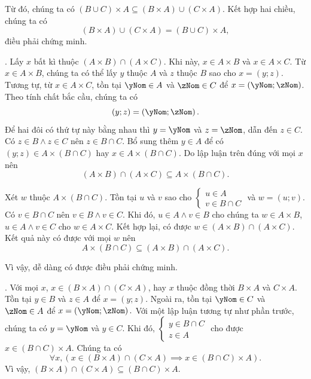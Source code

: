 Từ đó, chúng ta có $(B \cup C) \times A \subseteq (B \times A) \cup (C \times A)$. Kết hợp hai chiều, chúng ta có $$(B \times A) \cup (C \times A) = (B \cup C) \times A,$$
điều phải chứng minh.

. Lấy $x$ bất kì thuộc $(A \times B) \cap (A \times C)$. Khi này, $x \in A \times B$ và $x \in A \times C$. Từ $x \in A \times B$, chúng ta có thể lấy $y$ thuộc $A$ và $z$ thuộc $B$ sao cho $x = (y; z)$. Tương tự, từ $x \in A \times C$, tồn tại $\yNom \in A$ và $\zNom \in C$ để $x = \left(\yNom; \zNom\right)$. Theo tính chất bắc cầu, chúng ta có $$(y; z) = \left(\yNom; \zNom\right).$$ Để hai đôi có thứ tự này bằng nhau thì $y = \yNom$ và $z = \zNom$, dẫn đến $z \in C$. Có $z \in B \land z \in C$ nên $z \in B \cap C$. Bổ sung thêm $y \in A$ để có $(y; z) \in A \times (B \cap C)$ hay $x \in A \times (B \cap C)$. Do lập luận trên đúng với mọi $x$ nên \begin{equation*}
   (A \times B) \cap (A \times C) \subseteq A \times (B \cap C).
\end{equation*}

Xét $w$ thuộc $A \times (B \cap C)$. Tồn tại $u$ và $v$ sao cho $\begin{cases}
   u \in A \\
   v \in B \cap C
\end{cases}$ và $w = (u; v)$. Có $v \in B \cap C$ nên $v \in B \land v \in C$. Khi đó, $u \in A \land v \in B$ cho chúng ta $w \in A \times B$, $u \in A \land v \in C$ cho $w \in A \times C$. Kết hợp lại, có được $w \in (A \times B) \cap (A \times C)$. Kết quả này có được với mọi $w$ nên \begin{equation*}
   A \times (B \cap C) \subseteq (A \times B) \cap (A \times C).
\end{equation*}  

Vì vậy, dễ dàng có được điều phải chứng minh.

. Với mọi $x$, $x \in (B \times A) \cap (C \times A)$, hay $x$ thuộc đồng thời $B \times A$ và $C \times A$. Tồn tại $y \in B$ và $z \in A$ để $x = (y; z)$. Ngoài ra, tồn tại $\yNom \in C$ và $\zNom \in A$ để $x = \left(\yNom; \zNom\right).$ Với một lập luận tương tự như phần trước, chúng ta có $y = \yNom$ và $y \in C$. Khi đó, $\begin{cases}
   y \in B \cap C \\
   z \in A
\end{cases}$ cho được $x \in (B \cap C) \times A$. Chúng ta có $$\forall x, \left(x \in (B \times A) \cap (C \times A) \implies x \in (B \cap C) \times A\right).$$ Vì vậy, $(B \times A) \cap (C \times A) \subseteq (B \cap C) \times A$.

